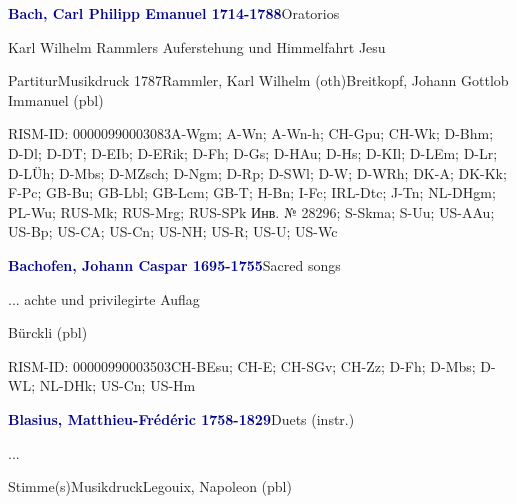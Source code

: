 \documentclass[twocolumn, 12pt]{book}
\begin{document}
\par \vspace{16pt} \textcolor{darkblue}{\textbf{Bach, Carl Philipp Emanuel  1714-1788}}\hfillplus{\textbf{[241]}}\newline Oratorios
\par \begin{itshape}Karl Wilhelm Rammlers Auferstehung und Himmelfahrt Jesu\end{itshape} 
\par \textcolor{darkblue}{}  Partitur\newline Musikdruck  1787\newline Rammler, Karl Wilhelm  (oth)\newline Breitkopf, Johann Gottlob Immanuel  (pbl)
\par RISM-ID: 00000990003083\newline A-Wgm; A-Wn; A-Wn-h; CH-Gpu; CH-Wk; D-Bhm; D-Dl; D-DT; D-EIb; D-ERik; D-Fh; D-Gs; D-HAu; D-Hs; D-KIl; D-LEm; D-Lr; D-LÜh; D-Mbs; D-MZsch; D-Ngm; D-Rp; D-SWl; D-W; D-WRh; DK-A; DK-Kk; F-Pc; GB-Bu; GB-Lbl; GB-Lcm; GB-T; H-Bn; I-Fc; IRL-Dtc; J-Tn; NL-DHgm; PL-Wu; RUS-Mk; RUS-Mrg; RUS-SPk  Инв. № 28296; S-Skma; S-Uu; US-AAu; US-Bp; US-CA; US-Cn; US-NH; US-R; US-U; US-Wc
\par \vspace{16pt} \textcolor{darkblue}{\textbf{Bachofen, Johann Caspar  1695-1755}}\hfillplus{\textbf{[242]}}\newline Sacred songs
\par \begin{itshape}... achte und privilegirte Auflag\end{itshape} \newline Bürckli  (pbl)
\par RISM-ID: 00000990003503\newline CH-BEsu; CH-E; CH-SGv; CH-Zz; D-Fh; D-Mbs; D-WL; NL-DHk; US-Cn; US-Hm
\par \vspace{16pt} \textcolor{darkblue}{\textbf{Blasius, Matthieu-Frédéric  1758-1829}}\hfillplus{\textbf{[243]}}\newline Duets (instr.)
\par \begin{itshape}...\end{itshape} 
\par \textcolor{darkblue}{}  Stimme(s)\newline Musikdruck\newline Legouix, Napoleon  (pbl)
\end{document}
